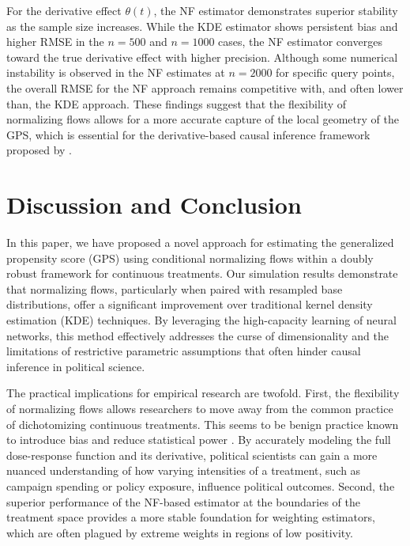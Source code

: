 \documentclass[12pt]{article}
\theoremstyle{definition}
\begin{document}
For the derivative effect $\theta(t)$, the NF estimator demonstrates superior stability as the sample size increases. While the KDE estimator shows persistent bias and higher RMSE in the $n=500$ and $n=1000$ cases, the NF estimator converges toward the true derivative effect with higher precision. Although some numerical instability is observed in the NF estimates at $n=2000$ for specific query points, the overall RMSE for the NF approach remains competitive with, and often lower than, the KDE approach. These findings suggest that the flexibility of normalizing flows allows for a more accurate capture of the local geometry of the GPS, which is essential for the derivative-based causal inference framework proposed by \citet{Zhang2025a}.

\section{Discussion and Conclusion}

In this paper, we have proposed a novel approach for estimating the generalized propensity score (GPS) using conditional normalizing flows within a doubly robust framework for continuous treatments. Our simulation results demonstrate that normalizing flows, particularly when paired with resampled base distributions, offer a significant improvement over traditional kernel density estimation (KDE) techniques. By leveraging the high-capacity learning of neural networks, this method effectively addresses the curse of dimensionality and the limitations of restrictive parametric assumptions that often hinder causal inference in political science.

The practical implications for empirical research are twofold. First, the flexibility of normalizing flows allows researchers to move away from the common practice of dichotomizing continuous treatments. This seems to be benign practice known to introduce bias and reduce statistical power \citep{Royston2005a}. By accurately modeling the full dose-response function and its derivative, political scientists can gain a more nuanced understanding of how varying intensities of a treatment, such as campaign spending or policy exposure, influence political outcomes. Second, the superior performance of the NF-based estimator at the boundaries of the treatment space provides a more stable foundation for weighting estimators, which are often plagued by extreme weights in regions of low positivity.
\end{document}
